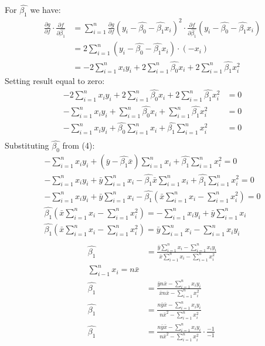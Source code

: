 \documentclass{article}
\begin{document}
For $\hat{\beta_1}$ we have:
\begin{align*}
\frac{\partial g}{\partial f}\cdot\frac{\partial f} {\partial \hat{\beta_1}} & = 
\sum_{i=1}^{n} \frac{\partial g}{\partial f} (y_i - \hat{\beta_{0}} - \hat{\beta_{1}}x_i)^2 \cdot \frac{\partial f} {\partial \hat{\beta_1}} (y_i - \hat{\beta_{0}} - \hat{\beta_{1}}x_i) \\
& = 2 \sum_{i=1}^{n} (y_i - \hat{\beta_{0}} - \hat{\beta_{1}}x_i) \cdot 
(-x_i) \\
& =  -2\sum_{i=1}^{n}x_i y_i + 2\sum_{i=1}^{n}\hat{\beta_{0}}x_i + 2\sum_{i=1}^{n}\hat{\beta_{1}}x_i^2
\end{align*}
Setting result equal to zero:
\begin{align*}
-2\sum_{i=1}^{n}x_i y_i + 2\sum_{i=1}^{n}\hat{\beta_{0}}x_i + 2\sum_{i=1}^{n}\hat{\beta_{1}}x_i^2 & = 0 \\
-\sum_{i=1}^{n}x_i y_i + \sum_{i=1}^{n}\hat{\beta_{0}}x_i + \sum_{i=1}^{n}\hat{\beta_{1}}x_i^2 & = 0 \\
-\sum_{i=1}^{n}x_i y_i + \hat{\beta_{0}}\sum_{i=1}^{n}x_i + \hat{\beta_{1}} \sum_{i=1}^{n}x_i^2 & = 0 \\
\end{align*}
Substituting $\hat{\beta_0}$ from (4):
\begin{gather*}
-\sum_{i=1}^{n}x_i y_i + (\bar{y} - \hat{\beta_1}\bar{x})\sum_{i=1}^{n}x_i + \hat{\beta_{1}} \sum_{i=1}^{n}x_i^2  = 0 \\
-\sum_{i=1}^{n}x_i y_i + \bar{y}\sum_{i=1}^{n}x_i - \hat{\beta_1}\bar{x}\sum_{i=1}^{n}x_i + \hat{\beta_{1}} \sum_{i=1}^{n}x_i^2  = 0 \\
-\sum_{i=1}^{n}x_i y_i + \bar{y}\sum_{i=1}^{n}x_i - \hat{\beta_1}(\bar{x}\sum_{i=1}^{n}x_i - \sum_{i=1}^{n}x_i^2)  = 0 \\
\hat{\beta_1}(\bar{x}\sum_{i=1}^{n}x_i - \sum_{i=1}^{n}x_i^2) = -\sum_{i=1}^{n}x_i y_i  + \bar{y}\sum_{i=1}^{n}x_i \\
\hat{\beta_1}(\bar{x}\sum_{i=1}^{n}x_i - \sum_{i=1}^{n}x_i^2) =  \bar{y}\sum_{i=1}^{n}x_i 
- \sum_{i=1}^{n}x_i y_i \\
\end{gather*}
\begin{align*}
\hat{\beta_1} & =  \frac{\bar{y}\sum_{i=1}^{n}x_i 
- \sum_{i=1}^{n}x_i y_i }{\bar{x}\sum_{i=1}^{n}x_i - \sum_{i=1}^{n}x_i^2}  \\
\sum_{i - 1}^{n}x_i = n\bar{x}\\
\hat{\beta_1} & =  \frac{\bar{y}n\bar{x} 
- \sum_{i=1}^{n}x_i y_i }{\bar{x}n\bar{x} - \sum_{i=1}^{n}x_i^2}  \\
\hat{\beta_1} & =  \frac{n\bar{y}\bar{x} 
- \sum_{i=1}^{n}x_i y_i }{n\bar{x}^2 - \sum_{i=1}^{n}x_i^2} \\
\hat{\beta_1} & =  \frac{n\bar{y}\bar{x} 
- \sum_{i=1}^{n}x_i y_i}{n\bar{x}^2 - \sum_{i=1}^{n}x_i^2} \cdot \frac{-1}{-1 } \\
\end{align*}
\end{document}
